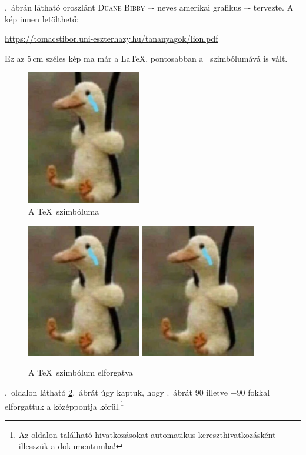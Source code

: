 \documentclass[a4paper,12pt]{article}
\begin{document}
\Az{\ref{figure-TeXszimb}}.~ábrán látható oroszlánt \textsc{Duane Bibby} –- neves amerikai grafikus –- tervezte. A kép innen letölthető:
\begin{center}
	\url{https://tomacstibor.uni-eszterhazy.hu/tananyagok/lion.pdf}
\end{center}
Ez az 5\,cm széles kép ma már a \LaTeX, pontosabban a \LaTeXe\ szimbólumává is vált.
\begin{figure}[!ht]
	\centering
		\includegraphics[width=5cm]{kacsa}
		\caption{A \TeX\ szimbóluma}
\label{figure-TeXszimb}
\end{figure}

\begin{figure}[!ht]
	\centering
	\includegraphics[width=5cm,angle=90,origin=c]{kacsa}%
	\includegraphics[width=5cm,angle=-90,origin=c]{kacsa}
	\caption{A \TeX\ szimbólum elforgatva}
	\label{figure-TeXszimb-forgatva}
\end{figure}
\Az{\pageref{figure-TeXszimb-forgatva}}.~oldalon látható \ref{figure-TeXszimb-forgatva}.~ábrát úgy kaptuk, hogy \az{\ref{figure-TeXszimb}}.~ábrát 90 illetve $-90$ fokkal elforgattuk a középpontja körül.\footnote{Az oldalon található hivatkozásokat automatikus kereszthivatkozásként illesszük a dokumentumba!}
\end{document}
